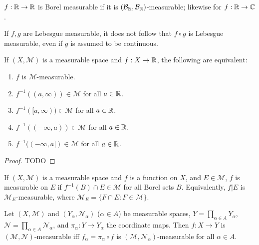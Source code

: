 \begin{definition}
    $f: \mathbb{R} \to \mathbb{R}$ is Borel measurable if it is $(\mathcal{B}_{\mathbb{R}}, \mathcal{B}_{\mathbb{R}})$-measurable; likewise for $f:\mathbb{R} \to \mathbb{C}$.
\end{definition}

\begin{remark}
    If $f, g$ are Lebesgue measurable, it does not follow that $f \circ g$ is Lebesgue measurable, even if $g$ is assumed to be continuous.
\end{remark}

\begin{proposition}
    If $(X, \mathcal{M})$ is a measurable space and $f: X \to \mathbb{R}$, the following are equivalent:
    \begin{enumerate}
        \item $f$ is $\mathcal{M}$-measurable.
        \item $f^{-1}((a, \infty)) \in \mathcal{M}$ for all $a \in \mathbb{R}$.
        \item $f^{-1}([a, \infty)) \in \mathcal{M}$ for all $a \in \mathbb{R}$.
        \item $f^{-1}((-\infty, a)) \in \mathcal{M}$ for all $a \in \mathbb{R}$.
        \item $f^{-1}((-\infty, a]) \in \mathcal{M}$ for all $a \in \mathbb{R}$.
    \end{enumerate}
\end{proposition}

\begin{proof}
    TODO
\end{proof}

\begin{definition}
    If $(X, \mathcal{M})$ is a measurable space and $f$ is a function on $X$, and $E \in \mathcal{M}$, $f$ is measurable on $E$ if $f^{-1}(B) \cap E \in \mathcal{M}$ for all Borel sets $B$.
    Equivalently, $f|E$ is $\mathcal{M}_E$-measurable, where $\mathcal{M}_E = \{ F \cap E: F \in \mathcal{M} \}$.
\end{definition}

\begin{proposition}
    Let $(X, \mathcal{M})$ and $(Y_{\alpha}, \mathcal{N}_{\alpha})$ ($\alpha \in A$) be measurable spaces, $Y = \prod_{\alpha \in A} Y_{\alpha}$, $\mathcal{N} = \prod_{\alpha \in A} \mathcal{N}_{\alpha}$, and $\pi_{\alpha}: Y \to Y_{\alpha}$ the coordinate maps. Then $f: X \to Y$ is $(\mathcal{M}, \mathcal{N})$-measurable iff $f_{\alpha} = \pi_{\alpha} \circ f$ is $(\mathcal{M}, \mathcal{N}_{\alpha})$-measurable for all $\alpha \in A$.
\end{proposition}

